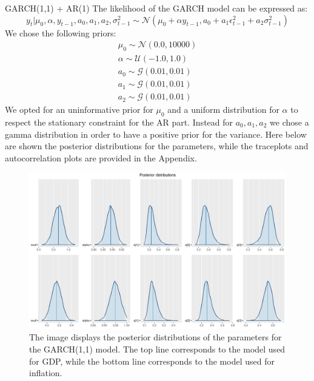 GARCH(1,1) + AR(1)
The likelihood of the GARCH model can be expressed as:
\begin{equation}
    y_{t}|\mu_{0},\alpha,y_{t-1},a_0,a_1,a_2,\sigma^2_{t-1}\sim \mathcal{N}(\mu_{0} + \alpha y_{t-1}, a_0 + a_1 \epsilon^2_{t-1} + a_2 \sigma^2_{t-1})
\end{equation}
We chose the following priors:
\begin{equation}
    \begin{split}
        \mu_0 \sim \mathcal{N}(0.0, 10000) \\
        \alpha \sim \mathcal{U}(-1.0, 1.0) \\
        a_0 \sim \mathcal{G}(0.01, 0.01) \\
        a_1 \sim \mathcal{G}(0.01, 0.01) \\
        a_2 \sim \mathcal{G}(0.01, 0.01)
    \end{split}
\end{equation}
We opted for an uninformative prior for $\mu_{0}$ and a uniform distribution for $\alpha$ to respect the stationary constraint for the AR part. Instead for $a_0, a_1, a_2$ we chose a gamma distribution in order to have a positive prior for the variance.
Here below are shown the posterior distributions for the parameters, while the traceplots and autocorrelation plots are provided in the Appendix.
\begin{figure}[h]
    \centering
    \includegraphics[width=\textwidth]{images/5-GARCH/posteriors.png}
    \caption{The image displays the posterior distributions of the parameters for the GARCH(1,1) model. The top line corresponds to the model used for GDP, while the bottom line corresponds to the model used for inflation.}
    \label{fig:GARCH_posteriors}
\end{figure}

